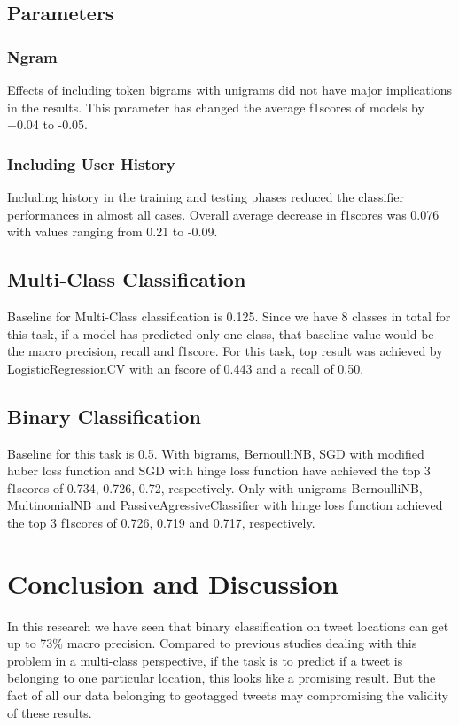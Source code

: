 \documentclass[twoside,11pt]{article}
\begin{document}
\subsection{Parameters}

\subsubsection{Ngram}
Effects of including token bigrams with unigrams did not have major implications in the results. This parameter has changed the average f1scores of models by +0.04 to -0.05. 

\subsubsection{Including User History}
Including history in the training and testing phases reduced the classifier performances in almost all cases. Overall average decrease in f1scores was 0.076 with values 
ranging from 0.21 to -0.09.

\subsection{Multi-Class Classification}
Baseline for Multi-Class classification is 0.125. Since we have 8 classes in total for this task, if a model has predicted only one class, that baseline value would be the macro precision, recall and f1score. 
For this task, top result was achieved by LogisticRegressionCV with an fscore of 0.443 and a recall of 0.50.

\subsection{Binary Classification}
Baseline for this task is 0.5. With bigrams, BernoulliNB, SGD with modified huber loss function and SGD with hinge loss function have achieved the top 3 f1scores of 0.734, 0.726, 0.72, respectively. 
Only with unigrams BernoulliNB, MultinomialNB and PassiveAgressiveClassifier with hinge loss function achieved the top 3 f1scores of 0.726, 0.719 and 0.717, respectively. 


\section{Conclusion and Discussion}
In this research we have seen that binary classification on tweet locations can get up to 73\% macro precision. Compared to previous studies dealing with this problem in a multi-class perspective, if the task is to predict if a tweet is belonging to one particular location, this looks like a promising result. But the fact of all our data belonging to geotagged tweets may compromising the validity of these results.
\end{document}
